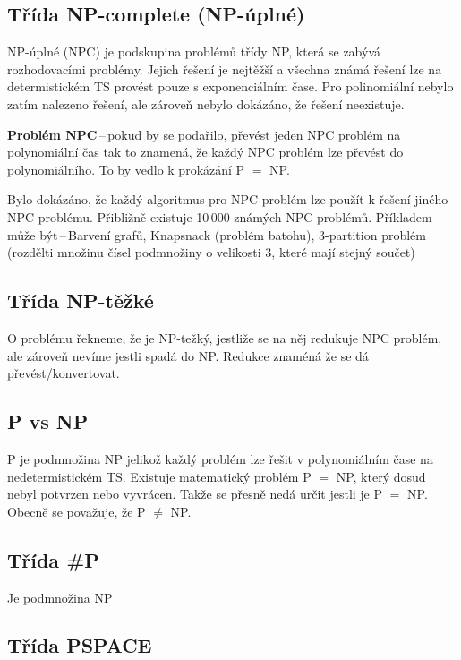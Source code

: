 \subsection{Třída NP-complete (NP-úplné)}

NP-úplné (NPC) je podskupina problémů třídy NP, která se zabývá rozhodovacími problémy.
Jejich řešení je nejtěžší a všechna známá řešení lze na determistickém TS provést pouze s exponenciálním čase. 
Pro polinomiální nebylo zatím nalezeno řešení, ale zároveň nebylo dokázáno, že řešení neexistuje.

\textbf{Problém NPC}\,--\,pokud by se podařilo, převést jeden NPC problém na polynomiální čas tak to znamená, že každý NPC problém lze převést do polynomiálního. 
To by vedlo k prokázání P $=$ NP.

Bylo dokázáno, že každý algoritmus pro NPC problém lze použít k řešení jiného NPC problému.
Přibližně existuje 10\,000 známých NPC problémů.
Příkladem může být\,--\,Barvení grafů, Knapsnack (problém batohu), 3-partition problém (rozdělti množinu čísel podmnožiny o velikosti 3, které mají stejný součet)

\subsection{Třída NP-těžké}

O problému řekneme, že je NP-težký, jestliže se na něj redukuje NPC problém, ale zároveň nevíme jestli spadá do NP.
Redukce znaméná že se dá převést/konvertovat.

\subsection{P vs NP}

P je podmnožina NP jelikož každý problém lze řešit v polynomiálním čase na
 nedetermistickém TS.
Existuje matematický problém P $=$ NP, který dosud nebyl potvrzen nebo vyvrácen. Takže se přesně nedá určit jestli je P $=$ NP. 
Obecně se považuje, že P $\neq$ NP.

\subsection{Třída \#P}

Je podmnožina NP

\subsection{Třída PSPACE}

